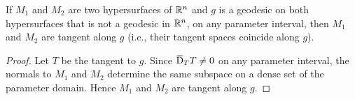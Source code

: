 \documentclass[../main]{subfiles}
\begin{document}
\begin{corollary}
If $M_1$ and $M_2$ are two hypersurfaces of $\mathbb{R}^n$ and $g$ is a geodesic on both hypersurfaces that is not a geodesic in $\mathbb{R}^n$, on any parameter interval, then $M_1$ and $M_2$ are tangent along $g$ (i.e., their tangent spaces coincide along $g$).
\end{corollary} 

\begin{proof}
Let $T$ be the tangent to $g$. Since $\covariant_T T \neq 0$ on any parameter interval, the normals to $M_1$ and $M_2$ determine the same subspace on a dense set of the parameter domain. Hence $M_{1}$ and $M_{2}$ are tangent along $g$.
\end{proof}
\end{document}
